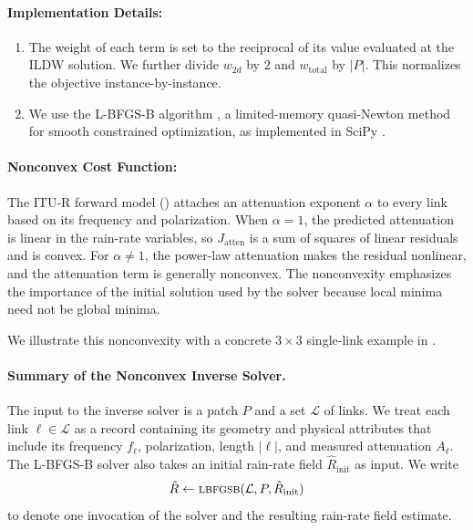 \documentclass[a4paper,fleqn]{cas-sc}
\DeclareRobustCommand{\LBFGSB}{\textsc{lbfgsb}}
\begin{document}
\paragraph{Implementation Details:}
\begin{enumerate}
  \item
        The weight of each term is set to the reciprocal of its value evaluated at the ILDW solution.
        We further divide $w_{2d}$ by $2$ and $w_{\mathrm{total}}$ by $|P|$.
        This normalizes the objective instance-by-instance.
  \item
        We use the L-BFGS-B algorithm \citep{byrd1995limited,zhu1997algorithm}, a limited-memory quasi-Newton method for smooth constrained optimization, as implemented in SciPy \citep{scipy}.
\end{enumerate}

\paragraph{Nonconvex Cost Function:}
The ITU-R forward model () attaches an attenuation exponent $\alpha$ to every link based on its frequency and polarization.
When $\alpha=1$, the predicted attenuation is linear in the rain-rate variables, so
$J_{\mathrm{atten}}$ is a sum of squares of linear residuals and is convex.
For $\alpha\neq 1$, the power-law attenuation makes the residual nonlinear,
and the attenuation term is generally nonconvex.
The nonconvexity emphasizes the importance of the initial solution used by the solver because local minima need not be global minima.

We illustrate this nonconvexity with a concrete $3\times3$ single-link example in .

\paragraph{Summary of the Nonconvex Inverse Solver.}
The input to the inverse solver is a patch $P$ and a set $\mathcal{L}$ of links.
We treat each link $\ell\in\mathcal{L}$ as a record containing its geometry and physical attributes that include its frequency $f_\ell$, polarization, length $|\ell|$, and measured attenuation $A_\ell$.
The L-BFGS-B solver also takes an initial rain-rate field $\hat{R}_{\mathrm{init}}$ as input.
We write
\[
  \hat{R}\gets \LBFGSB(\mathcal{L},P,\hat{R}_{\mathrm{init}})
\]
to denote one invocation of the solver and the resulting rain-rate field estimate.
\end{document}
